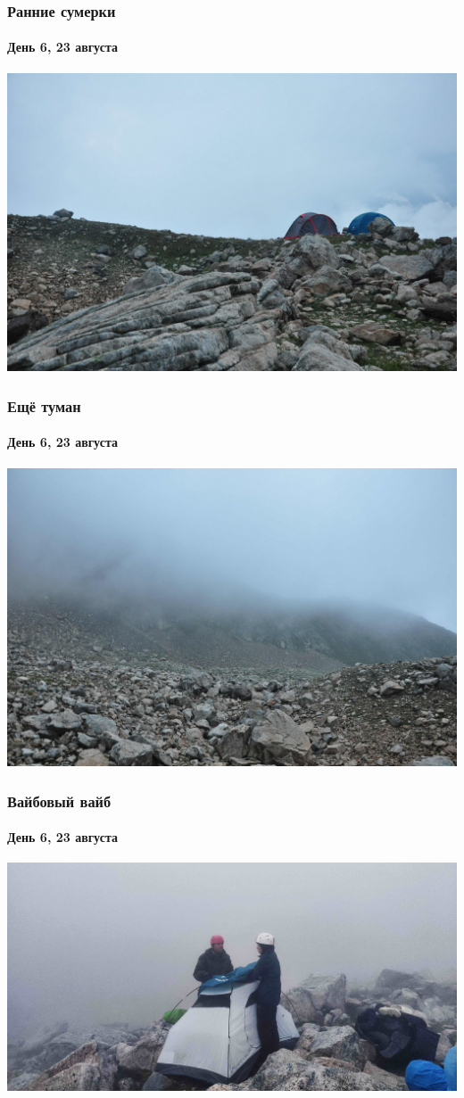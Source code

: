 \begin{frame}
	\frametitle{Ранние сумерки}
	\framesubtitle{День 6, 23 августа}
	\centering
	\includegraphics[width=\textwidth]{../pics/DSC_0094}			
\end{frame}

\begin{frame}
	\frametitle{Ещё туман}
	\framesubtitle{День 6, 23 августа}
	\centering
	\includegraphics[width=\textwidth]{../pics/DSC_0095}			
\end{frame}

\begin{frame}
	\frametitle{Вайбовый вайб}
	\framesubtitle{День 6, 23 августа}
	\centering
	\includegraphics[width=\textwidth]{../pics/IMG_20240823_184041}			
\end{frame}
